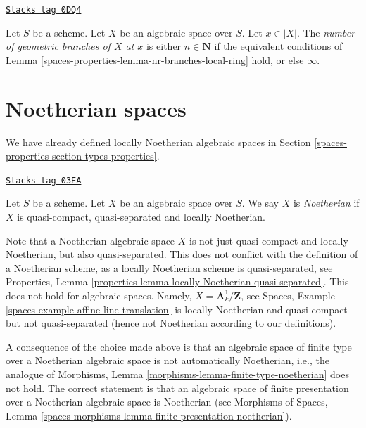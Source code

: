 \begin{definition}
\label{spaces-properties-definition-number-of-geometric-branches}
\href{https://stacks.math.columbia.edu/tag/0DQ4}{\texttt{Stacks tag 0DQ4}}

Let $S$ be a scheme.
Let $X$ be an algebraic space over $S$.
Let $x \in |X|$. The {\it number of geometric branches of $X$ at $x$} is
either $n \in \mathbf{N}$ if the equivalent conditions
of Lemma \ref{spaces-properties-lemma-nr-branches-local-ring}
hold, or else $\infty$.
\end{definition}

\section{Noetherian spaces}
\label{spaces-properties-section-noetherian}
We have already defined locally Noetherian algebraic spaces in
Section \ref{spaces-properties-section-types-properties}.

\begin{definition}[Noetherian]
\label{spaces-properties-definition-noetherian}
\href{https://stacks.math.columbia.edu/tag/03EA}{\texttt{Stacks tag 03EA}}

Let $S$ be a scheme. Let $X$ be an algebraic space over $S$.
We say $X$ is {\it Noetherian} if $X$ is quasi-compact, quasi-separated
and locally Noetherian.
\end{definition}

Note that a Noetherian algebraic space $X$ is not just quasi-compact
and locally Noetherian, but also quasi-separated. This does not conflict
with the definition of a Noetherian scheme, as a locally Noetherian
scheme is quasi-separated, see
Properties, Lemma \ref{properties-lemma-locally-Noetherian-quasi-separated}.
This does not hold for algebraic spaces. Namely,
$X = \mathbf{A}^1_k/\mathbf{Z}$, see
Spaces, Example \ref{spaces-example-affine-line-translation}
is locally Noetherian and quasi-compact but not quasi-separated
(hence not Noetherian according to our definitions).

\medskip\noindent
A consequence of the choice made above is that an algebraic space
of finite type over a Noetherian algebraic space is not automatically
Noetherian, i.e., the analogue of
Morphisms, Lemma \ref{morphisms-lemma-finite-type-noetherian}
does not hold. The correct statement is that an algebraic space of
finite presentation over a Noetherian algebraic space is Noetherian
(see
Morphisms of Spaces,
Lemma \ref{spaces-morphisms-lemma-finite-presentation-noetherian}).

